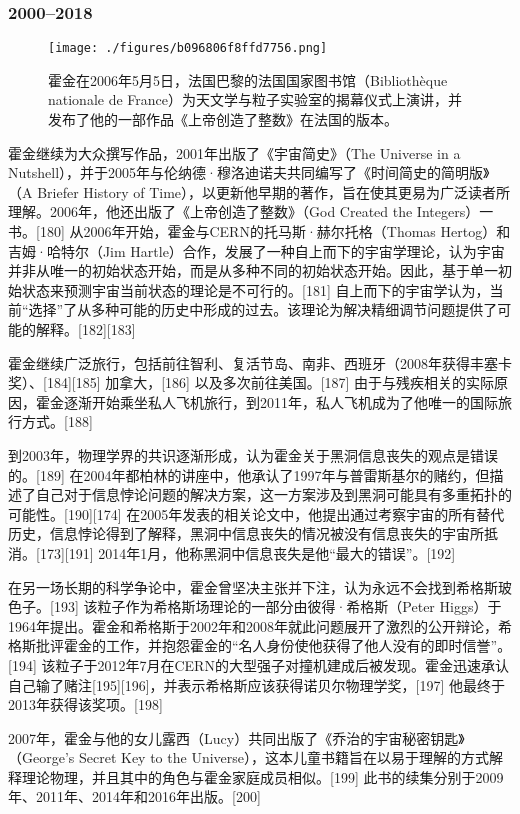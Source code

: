 \subsubsection{2000–2018}
\begin{figure}[ht]
\centering
\texttt{[image: ./figures/b096806f8ffd7756.png]}
\caption{霍金在2006年5月5日，法国巴黎的法国国家图书馆（Bibliothèque nationale de France）为天文学与粒子实验室的揭幕仪式上演讲，并发布了他的一部作品《上帝创造了整数》在法国的版本。} \label{fig_HJ_4}
\end{figure}
霍金继续为大众撰写作品，2001年出版了《宇宙简史》（The Universe in a Nutshell），并于2005年与伦纳德·穆洛迪诺夫共同编写了《时间简史的简明版》（A Briefer History of Time），以更新他早期的著作，旨在使其更易为广泛读者所理解。2006年，他还出版了《上帝创造了整数》（God Created the Integers）一书。[180] 从2006年开始，霍金与CERN的托马斯·赫尔托格（Thomas Hertog）和吉姆·哈特尔（Jim Hartle）合作，发展了一种自上而下的宇宙学理论，认为宇宙并非从唯一的初始状态开始，而是从多种不同的初始状态开始。因此，基于单一初始状态来预测宇宙当前状态的理论是不可行的。[181] 自上而下的宇宙学认为，当前“选择”了从多种可能的历史中形成的过去。该理论为解决精细调节问题提供了可能的解释。[182][183]

霍金继续广泛旅行，包括前往智利、复活节岛、南非、西班牙（2008年获得丰塞卡奖）、[184][185] 加拿大，[186] 以及多次前往美国。[187] 由于与残疾相关的实际原因，霍金逐渐开始乘坐私人飞机旅行，到2011年，私人飞机成为了他唯一的国际旅行方式。[188]

到2003年，物理学界的共识逐渐形成，认为霍金关于黑洞信息丧失的观点是错误的。[189] 在2004年都柏林的讲座中，他承认了1997年与普雷斯基尔的赌约，但描述了自己对于信息悖论问题的解决方案，这一方案涉及到黑洞可能具有多重拓扑的可能性。[190][174] 在2005年发表的相关论文中，他提出通过考察宇宙的所有替代历史，信息悖论得到了解释，黑洞中信息丧失的情况被没有信息丧失的宇宙所抵消。[173][191] 2014年1月，他称黑洞中信息丧失是他“最大的错误”。[192]

在另一场长期的科学争论中，霍金曾坚决主张并下注，认为永远不会找到希格斯玻色子。[193] 该粒子作为希格斯场理论的一部分由彼得·希格斯（Peter Higgs）于1964年提出。霍金和希格斯于2002年和2008年就此问题展开了激烈的公开辩论，希格斯批评霍金的工作，并抱怨霍金的“名人身份使他获得了他人没有的即时信誉”。[194] 该粒子于2012年7月在CERN的大型强子对撞机建成后被发现。霍金迅速承认自己输了赌注[195][196]，并表示希格斯应该获得诺贝尔物理学奖，[197] 他最终于2013年获得该奖项。[198]

2007年，霍金与他的女儿露西（Lucy）共同出版了《乔治的宇宙秘密钥匙》（George's Secret Key to the Universe），这本儿童书籍旨在以易于理解的方式解释理论物理，并且其中的角色与霍金家庭成员相似。[199] 此书的续集分别于2009年、2011年、2014年和2016年出版。[200]

